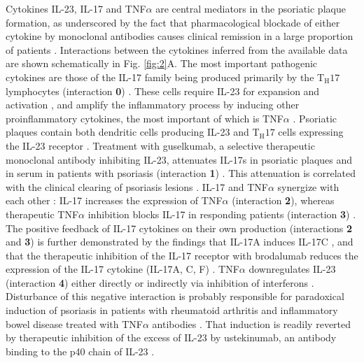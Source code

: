 Cytokines IL-23, IL-17 and TNF$\alpha$ are central mediators in the psoriatic plaque formation, as underscored by the fact that pharmacological blockade of either cytokine by monoclonal antibodies causes clinical remission in a large proportion of patients \citep{jabbar2017}. Interactions between the cytokines inferred from the available data are shown schematically in Fig. \ref{fig:2}A. The most important pathogenic cytokines are those of the IL-17 family being produced primarily by the T$_{\text{H}}17$ lymphocytes (interaction \textbf{0}) \citep{krueger2012}. These cells require IL-23 for expansion and activation \citep{cosmi2008, wilson2007, zheng2007}, and amplify the inflammatory process by inducing other proinflammatory cytokines, the most important of which is TNF$\alpha$ \citep{boehncke2015}. Psoriatic plaques contain both dendritic cells producing IL-23 and T$_{\text{H}}17$ cells expressing the IL-23 receptor \citep{cosmi2008, lee2004, tillack2014, wilson2007}. Treatment with guselkumab, a selective therapeutic monoclonal antibody inhibiting IL-23, attenuates IL-17s in psoriatic plaques and in serum in patients with psoriasis (interaction \textbf{1}) \citep{hawkes2018,sofen2014,tillack2014}. This attenuation is correlated with the clinical clearing of psoriasis lesions \citep{sofen2014}. IL-17 and TNF$\alpha$ synergize with each other \citep{alzabin2012, krueger2012, xu2017}: IL-17 increases the expression of TNF$\alpha$ \citep{jovanovic1998} (interaction \textbf{2}), whereas therapeutic TNF$\alpha$ inhibition blocks IL-17 in responding patients (interaction \textbf{3}) \citep{zaba2007, zaba2009}. The positive feedback of IL-17 cytokines on their own production (interactions \textbf{2} and \textbf{3}) is further demonstrated by the findings that IL-17A induces IL-17C \citep{xu2018}, and that the therapeutic inhibition of the IL-17 receptor with brodalumab reduces the expression of the IL-17 cytokine (IL-17A, C, F) \citep{russell2014}. TNF$\alpha$ downregulates IL-23 (interaction \textbf{4}) either directly \citep{notley2008, zakharova2005} or indirectly via inhibition of interferons \citep{palucka2005, tillack2014}. Disturbance of this negative interaction is probably responsible for paradoxical induction of psoriasis in patients with rheumatoid arthritis and inflammatory bowel disease treated with TNF$\alpha$ antibodies \citep{palucka2005, tillack2014}. That induction is readily reverted by therapeutic inhibition of the excess of IL-23 by ustekinumab, an antibody binding to the p40 chain of IL-23 \citep{tillack2014}. 


